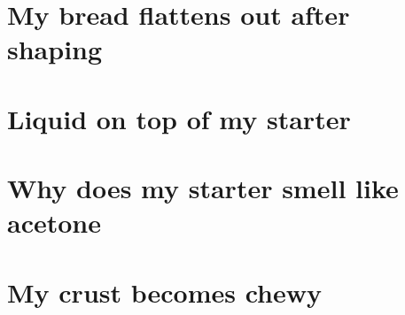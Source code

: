 \section{My bread flattens out after shaping}
\section{Liquid on top of my starter}
\section{Why does my starter smell like acetone}
\section{My crust becomes chewy}
